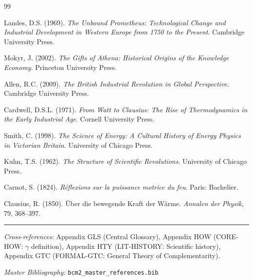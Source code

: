 \begin{thebibliography}{99}

 Landes, D.S. (1969). \textit{The Unbound Prometheus: Technological Change and Industrial Development in Western Europe from 1750 to the Present}. Cambridge University Press.

 Mokyr, J. (2002). \textit{The Gifts of Athena: Historical Origins of the Knowledge Economy}. Princeton University Press.

 Allen, R.C. (2009). \textit{The British Industrial Revolution in Global Perspective}. Cambridge University Press.

 Cardwell, D.S.L. (1971). \textit{From Watt to Clausius: The Rise of Thermodynamics in the Early Industrial Age}. Cornell University Press.

 Smith, C. (1998). \textit{The Science of Energy: A Cultural History of Energy Physics in Victorian Britain}. University of Chicago Press.

 Kuhn, T.S. (1962). \textit{The Structure of Scientific Revolutions}. University of Chicago Press.

 Carnot, S. (1824). \textit{Réflexions sur la puissance motrice du feu}. Paris: Bachelier.

 Clausius, R. (1850). Über die bewegende Kraft der Wärme. \textit{Annalen der Physik}, 79, 368--397.

\end{thebibliography}

\nocite{bcm_master}



\vspace{1em}
\hrule
\vspace{0.5em}

\noindent\textit{Cross-references:}
Appendix GLS (Central Glossary),
Appendix HOW (CORE-HOW: $\gamma$ definition),
Appendix HTY (LIT-HISTORY: Scientific history),
Appendix GTC (FORMAL-GTC: General Theory of Complementarity).

\noindent\textit{Master Bibliography:} \texttt{bcm2\_master\_references.bib}

